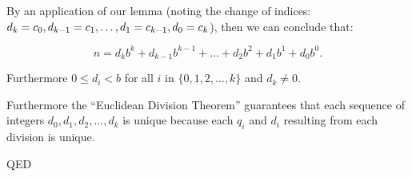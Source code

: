\documentclass{article}
\begin{document}
By an application of our lemma (noting the change of indices: \(d_k = c_0,
d_{k-1} = c_1, \dots{},\newline d_1 = c_{k-1}, d_0 = c_k\)), then we can conclude that:

\[n = d_kb^k+d_{k-1}b^{k-1}+\dots+d_2b^2+d_1b^1+d_0b^0.\]

Furthermore \(0\le{}d_i<b\) for all \(i\) in \(\{0,1,2,\dots{},k\}\) and \(d_k\ne0\).

Furthermore the ``Euclidean Division Theorem'' guarantees that each sequence
of integers \(d_0, d_1, d_2, \dots{}, d_k\) is unique
because each \(q_i\) and \(d_i\) resulting from each division is unique.

QED
\end{document}

